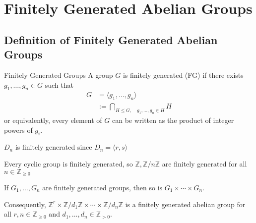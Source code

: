 \documentclass{article}
\begin{document}
\newpage 
\section{Finitely Generated Abelian Groups}
\subsection{Definition of Finitely Generated Abelian Groups}
\begin{definition}{Finitely Generated Groups}
    A group $G$ is finitely generated (FG) if there exists $g_1,\dots,g_n \in G$ such that
    \begin{align*}
        G &= \langle g_1,\dots, g_n\rangle \\ 
        &:= \bigcap_{H \le G,\quad g_1,\dots,g_n \in H} H
    \end{align*}
    or equivalently, every element of $G$ can be written as the product of integer powers of $g_i$.
\end{definition}
\begin{example}
    $D_n$ is finitely generated since $D_n = \langle r,s \rangle$
\end{example}
\begin{example}
    Every cyclic group is finitely generated, so $\mathbb{Z}, \mathbb{Z}/n\mathbb{Z}$ are finitely generated for all $n\in \mathbb{Z}_{\ge 0}$
\end{example}
\begin{example}
    If $G_1,\dots,G_n$ are finitely generated groups, then so is $G_1 \times \cdots \times G_n$.

    Consequently, $\mathbb{Z}^r \times \mathbb{Z}/d_1\mathbb{Z} \times \cdots \times \mathbb{Z}/d_n\mathbb{Z}$ is a finitely generated abelian group for all $r,n \in \mathbb{Z}_{\ge 0}$ and $d_1,\dots,d_n \in \mathbb{Z}_{>0}$.
\end{example}
\end{document}
